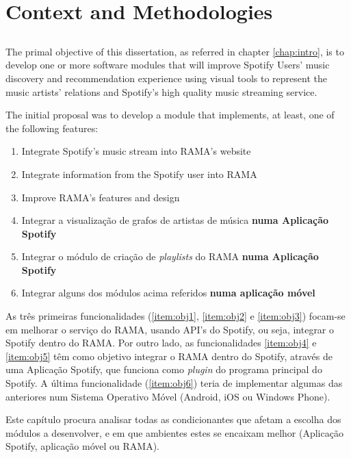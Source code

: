 
\chapter{Context and Methodologies}
\label{chap:chap3}

\section*{}

The primal objective of this dissertation, as referred in chapter \ref{chap:intro}, is to develop one or more software modules that will improve Spotify Users' music discovery and recommendation experience using visual tools to represent the music artists' relations and Spotify's high quality music streaming service.

The initial proposal was to develop a module that implements, at least, one of the following features:

\begin{enumerate}
  \item \label{item:obj1} Integrate Spotify's music stream into RAMA's website
  \item \label{item:obj2} Integrate information from the Spotify user into RAMA
  \item \label{item:obj3} Improve RAMA's features and design
  \item \label{item:obj4} Integrar a visualização de grafos de artistas de música \textbf{numa Aplicação Spotify}
  \item \label{item:obj5} Integrar o módulo de criação de \emph{playlists} do RAMA \textbf{numa Aplicação Spotify}
  \item \label{item:obj6} Integrar alguns dos módulos acima referidos \textbf{numa aplicação móvel}
\end{enumerate}

As três primeiras funcionalidades (\ref{item:obj1}, \ref{item:obj2} e \ref{item:obj3}) focam-se em melhorar o serviço do RAMA, usando API's do Spotify, ou seja, integrar o Spotify dentro do RAMA.
Por outro lado, as funcionalidades \ref{item:obj4} e \ref{item:obj5} têm como objetivo integrar o RAMA dentro do Spotify, através de uma Aplicação Spotify, que funciona como \emph{plugin} do programa principal do Spotify.
A última funcionalidade (\ref{item:obj6}) teria de implementar algumas das anteriores num Sistema Operativo Móvel (Android, iOS ou Windows Phone).

Este capítulo procura analisar todas as condicionantes que afetam a escolha  dos módulos a desenvolver, e em que ambientes estes se encaixam melhor (Aplicação Spotify, aplicação móvel ou RAMA).

